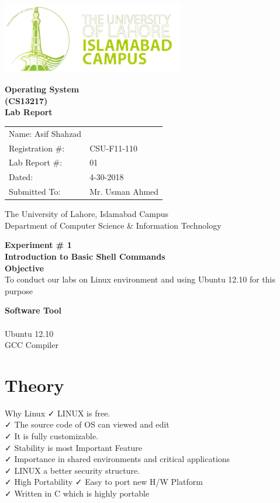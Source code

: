 ﻿\documentclass[11pt]{article}            %
\begin{document}
\begin{titlepage}
    \centering
  \vfill
    \includegraphics[width=8cm]{uni_logo.png} \\ 
	\vskip2cm
    {\bfseries\Large
	Operating System \\ (CS13217)\\
	
	\vskip2cm
	Lab Report 
	 
	\vskip2cm
	}    

\begin{center}
\begin{tabular}{ l l  } 

Name: Asif Shahzad\\ 
Registration \#: &CSU-F11-110 \\ 
Lab Report \#: & 01 \\ 
 Dated:& 4-30-2018\\ 
Submitted To:& Mr. Usman Ahmed\\ 

\end{tabular}
\end{center}
    \vfill
    The University of Lahore, Islamabad Campus\\
Department of Computer Science \& Information Technology
\end{titlepage}


    
    {\bfseries\Large
\centering
	Experiment \# 1 \\

Introduction to Basic Shell Commands\\
	
	}    
 \vskip1cm
 \textbf {Objective}\\ To conduct our labs on Linux environment and using Ubuntu 12.10 for this purpose
 
 \textbf {Software Tool} \\
 \\Ubuntu 12.10
\\GCC  Compiler


\section{Theory }  
Why Linux            
✓ LINUX is free. \\
✓ The source code of OS can viewed and edit \\
 ✓ It is fully customizable.\\ 
✓ Stability is most Important Feature\\
  ✓  Importance in shared environments and critical applications \\
✓ LINUX a better security structure. \\
✓ High Portability ✓ Easy to port new H/W Platform \\
✓ Written in C which is highly portable \\
\end{document}
